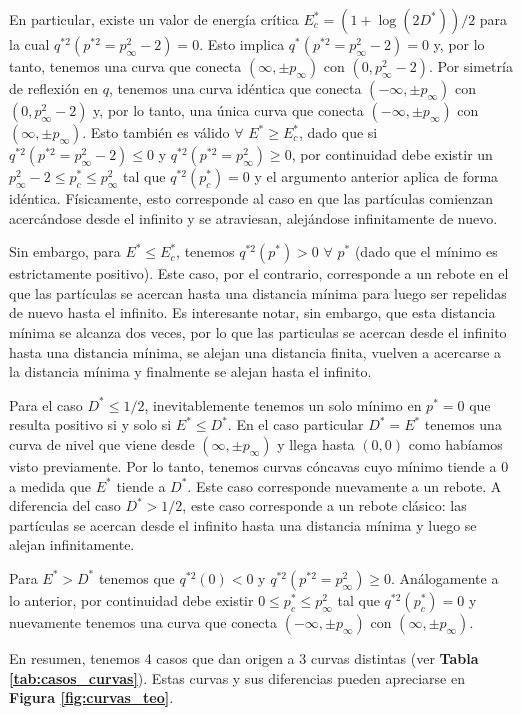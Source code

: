 En particular, existe un valor de energía crítica $E^*_c = (1+\log(2D^*))/2$ para la cual $q^{*2}(p^{*2}=p^2_\infty-2) = 0$.
Esto implica $q^*(p^{*2}=p^2_\infty-2)=0$ y, por lo tanto, tenemos una curva que conecta $(\infty, \pm p_\infty)$ con $(0,p^2_\infty-2)$.
Por simetría de reflexión en $q$, tenemos una curva idéntica que conecta $(-\infty, \pm p_\infty)$ con $(0,p^2_\infty-2)$ y, por lo tanto, una única curva que conecta $(-\infty, \pm p_\infty)$ con $(\infty, \pm p_\infty)$.
Esto también es válido $\forall$ $E^*\geq E^*_c$, dado que si $q^{*2}(p^{*2}=p_\infty^2-2)\leq 0$ y $q^{*2}(p^{*2}=p_\infty^2)\geq 0$, por continuidad debe existir un $p_\infty^2-2\leq p^*_c\leq p_\infty^2$  tal que $q^{*2}(p^*_c) = 0$ y el argumento anterior aplica de forma idéntica.
Físicamente, esto corresponde al caso en que las partículas comienzan acercándose desde el infinito y se atraviesan, alejándose infinitamente de nuevo.

Sin embargo, para $E^*\leq E^*_c$, tenemos $q^{*2}(p^*) > 0$  $\forall$ $p^*$ (dado que el mínimo es estrictamente positivo).
Este caso, por el contrario, corresponde a un rebote en el que las partículas se acercan hasta una distancia mínima para luego ser repelidas de nuevo hasta el infinito.
Es interesante notar, sin embargo, que esta distancia mínima se alcanza dos veces, por lo que las particulas se acercan desde el infinito hasta una distancia mínima, se alejan una distancia finita, vuelven a acercarse a la distancia mínima y finalmente se alejan hasta el infinito.

Para el caso $D^*\leq 1/2$, inevitablemente tenemos un solo mínimo en $p^*=0$ que resulta positivo si y solo si $E^*\leq D^*$.
En el caso particular $D^*=E^*$ tenemos una curva de nivel que viene desde $(\infty,\pm p_\infty)$ y llega hasta $(0,0)$ como habíamos visto previamente.
Por lo tanto, tenemos curvas cóncavas cuyo mínimo tiende a $0$ a medida que $E^*$ tiende a $D^*$.
Este caso corresponde nuevamente a un rebote.
A diferencia del caso $D^*>1/2$, este caso corresponde a un rebote clásico: las partículas se acercan desde el infinito hasta una distancia mínima y luego se alejan infinitamente.

Para $E^*>D^*$ tenemos que $q^{*2}(0) < 0$ y $q^{*2}(p^{*2}=p_\infty^2)\geq 0$.
Análogamente a lo anterior, por continuidad debe existir $0\leq p^*_c\leq p_\infty^2$ tal que $q^{*2}(p^*_c) = 0$ y nuevamente tenemos una curva que conecta $(-\infty, \pm p_\infty)$ con $(\infty, \pm p_\infty)$.

En resumen, tenemos 4 casos que dan origen a 3 curvas distintas (ver \textbf{Tabla \ref{tab:casos_curvas}}).
Estas curvas y sus diferencias pueden apreciarse en \textbf{Figura \ref{fig:curvas_teo}}.

